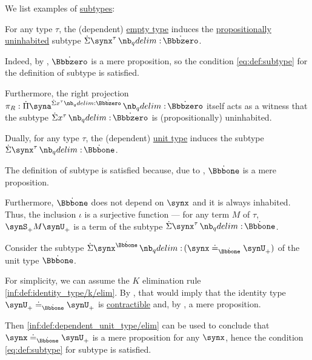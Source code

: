 \begin{example}\label{ex:def:subtype}
  We list examples of \hyperref[def:subtype]{subtypes}:
  \begin{thmenum}
     For any type \( \tau \), the (dependent) \hyperref[def:dependent_empty_type]{empty type} induces the \hyperref[def:propositionally_uninhabited]{propositionally uninhabited} subtype \( \qsum {\synx^\tau} \syn\Bbbzero \).

    Indeed, by , \( \syn\Bbbzero \) is a mere proposition, so the condition \eqref{eq:def:subtype} for the definition of subtype is satisfied.

    Furthermore, the right projection \( \pi_R: \qprod {\syna^{\qsum {x^\tau} \syn\Bbbzero}} \syn\Bbbzero \) itself acts as a witness that the subtype \( \qsum {x^\tau} \syn\Bbbzero \) is (propositionally) uninhabited.

     Dually, for any type \( \tau \), the (dependent) \hyperref[def:dependent_unit_type]{unit type} induces the subtype \( \qsum {\synx^\tau} \syn\Bbbone \).

    The definition of subtype is satisfied because, due to , \( \syn\Bbbone \) is a mere proposition.

    Furthermore, \( \syn\Bbbone \) does not depend on \( \synx \) and it is always inhabited. Thus, the inclusion \( \iota \) is a surjective function --- for any term \( M \) of \( \tau \), \( \synS_+ M \synU_+ \) is a term of the subtype \( \qsum {\synx^\tau} \syn\Bbbone \).

     Consider the subtype \( \qsum {\synx^{\syn\Bbbone}} (\synx \syneq_{\syn\Bbbone} \synU_+) \) of the unit type \( \syn\Bbbone \).

    For simplicity, we can assume the \( K \) elimination rule \ref{inf:def:identity_type/k/elim}. By , that would imply that the identity type \( \synU_+ \syneq_{\syn\Bbbone} \synU_+ \) is \hyperref[def:contractible_type]{contractible} and, by , a mere proposition.

    Then \ref{inf:def:dependent_unit_type/elim} can be used to conclude that \( \synx \syneq_{\syn\Bbbone} \synU_+ \) is a mere proposition for any \( \synx \), hence the condition \eqref{eq:def:subtype} for subtype is satisfied.
  \end{thmenum}
\end{example}

